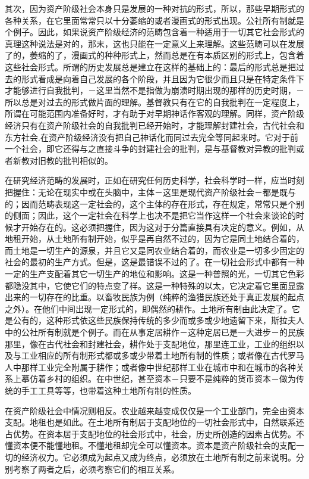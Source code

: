 \documentclass[a4paper,twoside,12pt]{ctexart}
\begin{document}
其次，因为资产阶级社会本身只是发展的一种对抗的形式，所以，那些早期形式的各种关系，在它里面常常只以十分萎缩的或者漫画式的形式出现。公社所有制就是个例子。因此，如果说资产阶级经济的范畴包含着一种适用于一切其它社会形式的真理这种说法是对的，那末，这也只能在一定意义上来理解。这些范畴可以在发展了的，萎缩的了，漫画式的种种形式上，然而总是在有本质区别的形式上，包含着这些社会形式。所谓的历史发展总是建立在这样的基础上的：最后的形式总是把过去的形式看成是向着自己发展的各个阶段，并且因为它很少而且只是在特定条件下才能够进行自我批判，－这里当然不是指做为崩溃时期出现的那样的历史时期，－所以总是对过去的形式做片面的理解。基督教只有在它的自我批判在一定程度上，所谓在可能范围内准备好时，才有助于对早期神话作客观的理解。同样，资产阶级经济只有在资产阶级社会的自我批判已经开始时，才能理解封建社会，古代社会和东方社会.在资产阶级经济没有把自己神话化而同过去完全等同起来时。它对于前一个社会，即它还得与之直接斗争的封建社会的批判，是与基督教对异教的批判或者新教对旧教的批判相似的。

在研究经济范畴的发展时，正如在研究任何历史科学，社会科学时一样，应当时刻把握住：无论在现实中或在头脑中，主体－这里是现代资产阶级社会－都是既与的；因而范畴表现这一定社会的，这个主体的存在形式，存在规定，常常只是个别的侧面；因此，这个一定社会在科学上也决不是把它当作这样一个社会来谈论的时候才开始存在的。这必须把握住，因为这对于分篇直接具有决定的意义。例如，从地租开始，从土地所有制开始，似乎是再自然不过的，因为它是同土地结合着的，而土地是一切生产的源泉，并且它又是同农业结合着的，而农业是一切多少固定的社会的最初的生产方式。但是，这是最错误不过的了。在一切社会形式中都有一种一定的生产支配着其它一切生产的地位和影响。这是一种普照的光，一切其它色彩都隐没其中，它使它们的特点变了样。这是一种特殊的以太，它决定着它里面显露出来的一切存在的比重。以畜牧民族为例（纯粹的渔猎民族还处于真正发展的起点之外）。在他们中间出现一定形式的，即偶然的耕作。土地所有制由此决定了。它是公有的，这种形式依这些民族保持传统的多少而或多或少地遗留下来，斯拉夫人中的公社所有制就是个例子。而在从事定居耕作－这种定居已是一大进步－的民族那里，像在古代社会和封建社会，耕作处于支配地位，那里连工业，工业的组织以及与工业相应的所有制形式都或多或少带着土地所有制的性质；或者像在古代罗马人中那样工业完全附属于耕作；或者像中世纪那样工业在城市中和在城市的各种关系上摹仿着乡村的组织。在中世纪，甚至资本－只要不是纯粹的货币资本－做为传统的手工工具等等，也带着这种土地所有制的性质。

在资产阶级社会中情况则相反。农业越来越变成仅仅是一个工业部门，完全由资本支配。地租也是如此。在土地所有制居于支配地位的一切社会形式中，自然联系还占优势。在资本居于支配地位的社会形式中，社会，历史所创造的因素占优势。不懂资本便不能懂地租。不懂地租却完全可以懂资本。资本是资产阶级社会的支配一切的经济权力。它必须成为起点又成为终点，必须放在土地所有制之前来说明。分别考察了两者之后，必须考察它们的相互关系。
\end{document}
